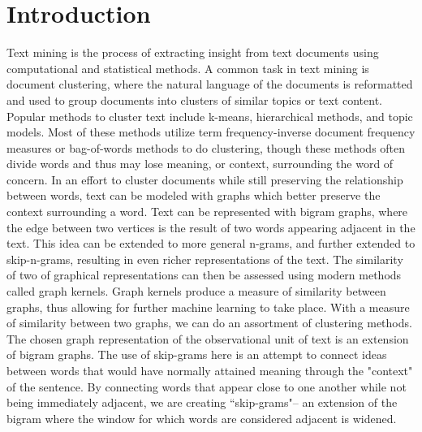 %
%
%

\chapter{Introduction}
\label{introduction}


Text mining is the process of extracting insight from text documents using computational and statistical methods. A common task in text mining is document clustering, where the natural language of the documents is reformatted and used to group documents into clusters of similar topics or text content. Popular methods to cluster text include k-means, hierarchical methods, and topic models. Most of these methods utilize term frequency-inverse document frequency measures  or bag-of-words methods to do clustering, though these methods often divide words and thus may lose meaning, or context, surrounding the word of concern. In an effort to cluster documents while still preserving the relationship between words, text can be modeled with graphs which better preserve the context surrounding a word. Text can be represented with bigram graphs, where the edge between two vertices is the result of two words appearing adjacent in the text. This idea can be extended to more general n-grams, and further extended to skip-n-grams, resulting in even richer representations of the text. The similarity of two of graphical representations can then be assessed using modern methods called graph kernels. Graph kernels produce a measure of similarity between graphs, thus allowing for further machine learning to take place. With a measure of similarity between two graphs, we can do an assortment of clustering methods. \\
The chosen graph representation of the observational unit of text is an extension of bigram graphs. The use of skip-grams here is an attempt to connect ideas between words that would have normally attained meaning through the "context" of the sentence. By connecting words that appear close to one another while not being immediately adjacent, we are creating ``skip-grams"-- an extension of the bigram where the window for which words are considered adjacent is widened. \\

